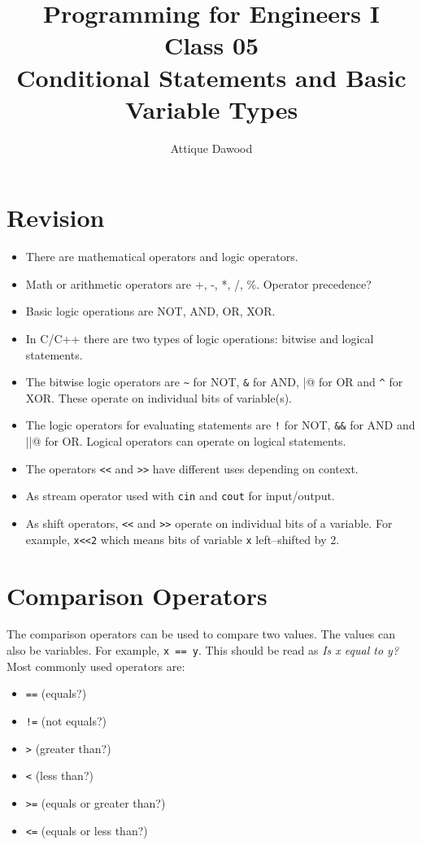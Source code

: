 \documentclass[12pt,a4paper]{article}
\title{\vspace{-2cm}Programming for Engineers I\\Class 05\\Conditional Statements and Basic Variable Types}
\author{Attique Dawood}
\begin{document}
\maketitle
\section{Revision}
\begin{itemize}
\item There are mathematical operators and logic operators.
\item Math or arithmetic operators are +, -, *, /, \%. Operator precedence?
\item Basic logic operations are NOT, AND, OR, XOR.
\item In C/C++ there are two types of logic operations: bitwise and logical statements.
\item The bitwise logic operators are \verb|~| for NOT, \verb|&| for AND, \verb@|@ for OR and \verb|^| for XOR. These operate on individual bits of variable(s).
\item The logic operators for evaluating statements are \verb|!| for NOT, \verb|&&| for AND and \verb@||@ for OR. Logical operators can operate on logical statements.
\item The operators \verb|<<| and \verb|>>| have different uses depending on context.
\item As stream operator used with \verb|cin| and \verb|cout| for input/output.
\item As shift operators, \verb|<<| and \verb|>>| operate on individual bits of a variable. For example, \verb|x<<2| which means bits of variable \verb|x| left--shifted by 2.
\end{itemize}
\section{Comparison Operators}
The comparison operators can be used to compare two values. The values can also be variables.  For example, \verb|x == y|. This should be read as \textit{Is x equal to y?} Most commonly used operators are:
\begin{itemize}
\item \verb|==| (equals?)
\item \verb|!=| (not equals?)
\item \verb|>| (greater than?)
\item \verb|<| (less than?)
\item \verb|>=| (equals or greater than?)
\item \verb|<=| (equals or less than?)
\end{itemize}
\end{document}
